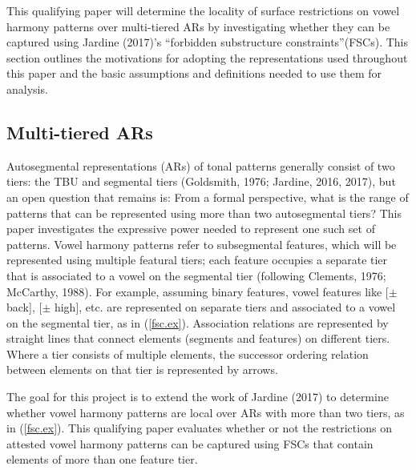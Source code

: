 \documentclass[,doc,floatsintext]{apa6}
\theoremstyle{definition}
\theoremstyle{definition}
\theoremstyle{definition}
\theoremstyle{remark}
\begin{document}
This qualifying paper will determine the locality of surface
restrictions on vowel harmony patterns over multi-tiered ARs by
investigating whether they can be captured using Jardine (2017)'s
\enquote{forbidden substructure constraints}(FSCs). This section
outlines the motivations for adopting the representations used
throughout this paper and the basic assumptions and definitions needed
to use them for analysis.

\subsection{Multi-tiered ARs}\label{multi-tiered-ars}

Autosegmental representations (ARs) of tonal patterns generally consist
of two tiers: the TBU and segmental tiers (Goldsmith, 1976; Jardine,
2016, 2017), but an open question that remains is: From a formal
perspective, what is the range of patterns that can be represented using
more than two autosegmental tiers? This paper investigates the
expressive power needed to represent one such set of patterns. Vowel
harmony patterns refer to subsegmental features, which will be
represented using multiple featural tiers; each feature occupies a
separate tier that is associated to a vowel on the segmental tier
(following Clements, 1976; McCarthy, 1988). For example, assuming binary
features, vowel features like {[}\(\pm\) back{]}, {[}\(\pm\) high{]},
etc. are represented on separate tiers and associated to a vowel on the
segmental tier, as in (\ref{fsc.ex}). Association relations are
represented by straight lines that connect elements (segments and
features) on different tiers. Where a tier consists of multiple
elements, the successor ordering relation between elements on that tier
is represented by arrows.

\begin{exe}
\ex \label{fsc.ex}
\end{exe}

The goal for this project is to extend the work of Jardine (2017) to
determine whether vowel harmony patterns are local over ARs with more
than two tiers, as in (\ref{fsc.ex}). This qualifying paper evaluates
whether or not the restrictions on attested vowel harmony patterns can
be captured using FSCs that contain elements of more than one feature
tier.
\end{document}
